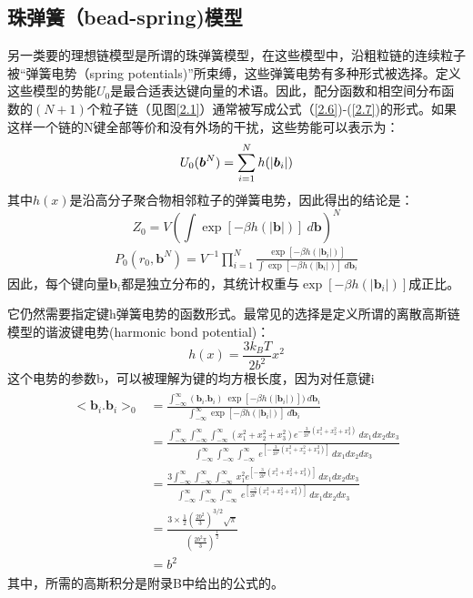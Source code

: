 \subsection{珠弹簧（bead-spring)模型}
另一类要的理想链模型是所谓的珠弹簧模型，在这些模型中，沿粗粒链的连续粒子被“弹簧电势（spring potentials)”所束缚，这些弹簧电势有多种形式被选择。定义这些模型的势能$U_{0}$是最合适表达键向量的术语。因此，配分函数和相空间分布函数的$(N+1)$个粒子链（见图\ref{2.1}）通常被写成公式（\ref{2.6})-(\ref{2.7})的形式。如果这样一个链的N键全部等价和没有外场的干扰，这些势能可以表示为：
\begin{equation}\label{2.26}
\begin{split}
U_{0}(\bm{b}^{N})= \sum_{i=1}^{N}h(|\bm{b}_{i}|)
\end{split}
\end{equation}
其中$h(x)$是沿高分子聚合物相邻粒子的弹簧电势，因此得出的结论是：
\begin{equation}\label{2.27}
Z_{0}=V(\int \exp[-\beta h(|\mathbf{b}|)]~d\mathbf{b})^N 
\end{equation}
\begin{equation}\label{2.28}
\begin{split}		
P_{0} (r_{0},\mathbf{b}^N) =V^{-1} \prod_{i=1}^{N} \frac{\exp[-\beta h(|\mathbf{b}_{i}|)]}{\int \exp[-\beta h(|\mathbf{b}_{i}|)]~d \mathbf{b}_{i}}
\end{split}
\end{equation}
因此，每个键向量$\mathbf{b}_{i}$都是独立分布的，其统计权重与$\exp[-\beta h(|\mathbf{b}_{i}|)]$成正比。 

它仍然需要指定键h弹簧电势的函数形式。最常见的选择是定义所谓的离散高斯链模型的谐波键电势(harmonic bond potential)： 
\begin{equation}\label{2.29}
h(x)=\frac{3k_{B}T}{2b^2} x^2  
\end{equation}
这个电势的参数b，可以被理解为键的均方根长度，因为对任意键i 
\begin{align}\label{2.30}
\begin{split}
<\mathbf{b}_{i}.\mathbf{b}_{i}>_{0}&= \frac{\int_{-\infty}^{\infty} (\mathbf{b}_{i}.\mathbf{b}_{i})~\exp[-\beta h(|\mathbf{b}_{i}|)])~d\mathbf{b}_{i}}{\int_{-\infty}^{\infty} \exp[-\beta h(|\mathbf{b}_{i}|)]~d\mathbf{b}_{i}}\\ &=\frac{\int_{-\infty}^{\infty}\int_{-\infty}^{\infty}\int_{-\infty}^{\infty}(x_1^2+x_2^2+x_3^2)e^{-\frac{3}{2b^2}(x_1^2+x_2^2+x_3^2)}~dx_1dx_2dx_3}{\int_{-\infty}^{\infty}\int_{-\infty}^{\infty}\int_{-\infty}^{\infty}~e^{[-\frac{3}{2b^2}(x_1^2+x_2^2+x_3^2)]}~dx_1dx_2dx_3}\\ &=\frac{3\int_{-\infty}^{\infty}\int_{-\infty}^{\infty}\int_{-\infty}^{\infty}~x_1^2e^{[-\frac{3}{2b^2}(x_1^2+x_2^2+x_3^2)]}~dx_1dx_2dx_3}{\int_{-\infty}^{\infty}\int_{-\infty}^{\infty}\int_{-\infty}^{\infty}~e^{[\frac{-3}{2b^2}(x_1^2+x_2^2+x_3^2)]}~dx_1dx_2dx_3}\\ &=\frac{3 \times\frac{1}{2} (\frac{2b^2}{3})^{3/2}\sqrt{\pi}}{(\frac{2b^2\pi}{3})^{\frac{1}{2}}}\\ &=b^2
\end{split}
\end{align}
其中，所需的高斯积分是附录B中给出的公式的。

